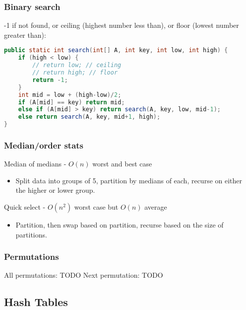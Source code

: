 \documentclass{article}
\begin{document}
\subsubsection{Binary search}
-1 if not found, or ceiling (highest number less than), or floor (lowest number greater than):
\begin{lstlisting}[language=java]
public static int search(int[] A, int key, int low, int high) {
    if (high < low) {
        // return low; // ceiling
        // return high; // floor
        return -1;
    }
    int mid = low + (high-low)/2;
    if (A[mid] == key) return mid;
    else if (A[mid] > key) return search(A, key, low, mid-1);
    else return search(A, key, mid+1, high);
}
\end{lstlisting}

\subsubsection{Median/order stats}
Median of medians - $O(n)$ worst and best case
\begin{itemize}
    \item Split data into groups of 5, partition by medians of each, recurse on either the higher or lower group.
\end{itemize}
Quick select - $O(n^2)$ worst case but $O(n)$ average
\begin{itemize}
    \item Partition, then swap based on partition, recurse based on the size of partitions.
\end{itemize}

\subsubsection{Permutations}
All permutations: TODO
Next permutation: TODO

\subsection{Hash Tables}
\end{document}
